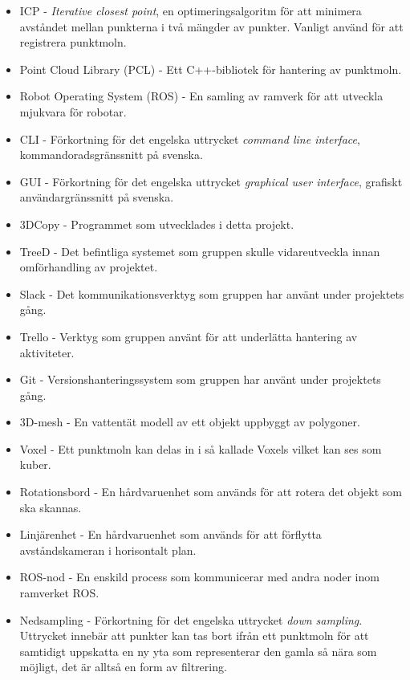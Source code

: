 \begin{itemize}
	\item ICP - \textit{Iterative closest point}, en optimeringsalgoritm för att minimera avståndet mellan punkterna i två mängder av punkter. Vanligt använd för att registrera punktmoln.
	\item Point Cloud Library (PCL) - Ett C++-bibliotek för hantering av punktmoln.
	\item Robot Operating System (ROS) - En samling av ramverk för att utveckla mjukvara för robotar.
	\item CLI - Förkortning för det engelska uttrycket \textit{command line interface}, kommandoradsgränssnitt på svenska.
	\item GUI - Förkortning för det engelska uttrycket \textit{graphical user interface}, grafiskt användargränssnitt på svenska.
	\item 3DCopy - Programmet som utvecklades i detta projekt.
	\item TreeD - Det befintliga systemet som gruppen skulle vidareutveckla innan omförhandling av projektet.
	\item Slack - Det kommunikationsverktyg som gruppen har använt under projektets gång.
	\item Trello - Verktyg som gruppen använt för att underlätta hantering av aktiviteter.
	\item Git - Versionshanteringssystem som gruppen har använt under projektets gång.
	\item 3D-mesh - En vattentät modell av ett objekt uppbyggt av polygoner.
	\item Voxel - Ett punktmoln kan delas in i så kallade Voxels vilket kan ses som kuber.
	\item Rotationsbord - En hårdvaruenhet som används för att rotera det objekt som ska skannas.
	\item Linjärenhet - En hårdvaruenhet som används för att förflytta avståndskameran i horisontalt plan.
	\item ROS-nod - En enskild process som kommunicerar med andra noder inom ramverket ROS.
	\item Nedsampling - Förkortning för det engelska uttrycket \textit{down sampling}. Uttrycket innebär att punkter kan tas bort ifrån ett punktmoln för att samtidigt uppskatta en ny yta som representerar den gamla så nära som möjligt, det är alltså en form av filtrering.
\end{itemize} 


